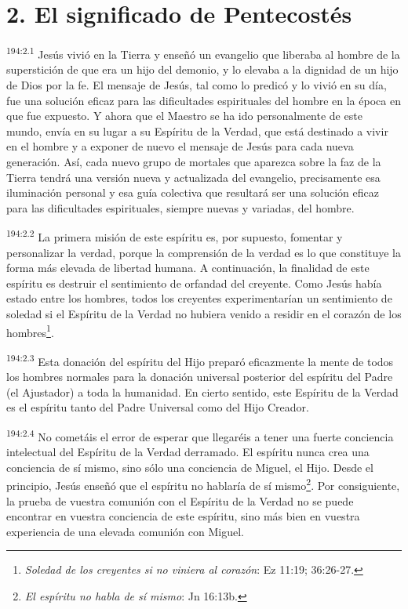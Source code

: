 \section*{2. El significado de Pentecostés}
\par
\textsuperscript{194:2.1} Jesús vivió en la Tierra y enseñó un evangelio que liberaba al hombre de la superstición de que era un hijo del demonio, y lo elevaba a la dignidad de un hijo de Dios por la fe. El mensaje de Jesús, tal como lo predicó y lo vivió en su día, fue una solución eficaz para las dificultades espirituales del hombre en la época en que fue expuesto. Y ahora que el Maestro se ha ido personalmente de este mundo, envía en su lugar a su Espíritu de la Verdad, que está destinado a vivir en el hombre y a exponer de nuevo el mensaje de Jesús para cada nueva generación. Así, cada nuevo grupo de mortales que aparezca sobre la faz de la Tierra tendrá una versión nueva y actualizada del evangelio, precisamente esa iluminación personal y esa guía colectiva que resultará ser una solución eficaz para las dificultades espirituales, siempre nuevas y variadas, del hombre.

\par
\textsuperscript{194:2.2} La primera misión de este espíritu es, por supuesto, fomentar y personalizar la verdad, porque la comprensión de la verdad es lo que constituye la forma más elevada de libertad humana. A continuación, la finalidad de este espíritu es destruir el sentimiento de orfandad del creyente. Como Jesús había estado entre los hombres, todos los creyentes experimentarían un sentimiento de soledad si el Espíritu de la Verdad no hubiera venido a residir en el corazón de los hombres\footnote{\textit{Soledad de los creyentes si no viniera al corazón}: Ez 11:19; 36:26-27.}.

\par
\textsuperscript{194:2.3} Esta donación del espíritu del Hijo preparó eficazmente la mente de todos los hombres normales para la donación universal posterior del espíritu del Padre (el Ajustador) a toda la humanidad. En cierto sentido, este Espíritu de la Verdad es el espíritu tanto del Padre Universal como del Hijo Creador.

\par
\textsuperscript{194:2.4} No cometáis el error de esperar que llegaréis a tener una fuerte conciencia intelectual del Espíritu de la Verdad derramado. El espíritu nunca crea una conciencia de sí mismo, sino sólo una conciencia de Miguel, el Hijo. Desde el principio, Jesús enseñó que el espíritu no hablaría de sí mismo\footnote{\textit{El espíritu no habla de sí mismo}: Jn 16:13b.}. Por consiguiente, la prueba de vuestra comunión con el Espíritu de la Verdad no se puede encontrar en vuestra conciencia de este espíritu, sino más bien en vuestra experiencia de una elevada comunión con Miguel.

